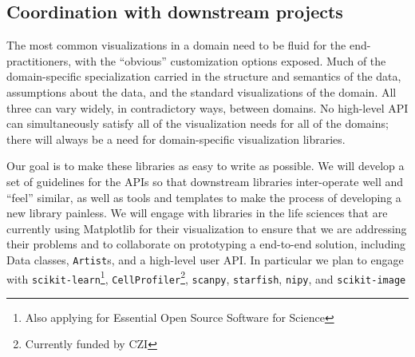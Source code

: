 \documentclass[11pt,letterpaper]{article}  %
\begin{document}
%
%
%

\subsection{Coordination with downstream projects}


The most common visualizations in a domain need to be fluid for the
end-practitioners, with the ``obvious'' customization options exposed.
Much of the domain-specific specialization carried in the structure
and semantics of the data, assumptions  about the
data, and the standard visualizations of the domain.  All three can
vary widely, in contradictory ways, between domains.  No high-level
API can simultaneously satisfy all of the visualization needs for all
of the domains; there will always be a need for domain-specific
visualization libraries.


Our goal is to make these libraries as easy to write as possible.
We will develop a set of guidelines for the APIs so that downstream
libraries inter-operate well and ``feel'' similar, as well as tools
and templates to make the process of developing a new library
painless.
We will engage with libraries in the life sciences that are currently
using Matplotlib for their visualization to ensure that we are
addressing their problems and to collaborate on prototyping a
end-to-end solution, including Data classes, \texttt{Artist}s, and a
high-level user API.  In particular we plan to engage with
\texttt{scikit-learn}\footnote{Also applying for Essential Open Source
Software for Science}, \texttt{CellProfiler}\footnote{Currently funded
by CZI\label{f:czi}}, \texttt{scanpy},
\texttt{starfish}, \texttt{nipy}, and
\texttt{scikit-image}
\end{document}
